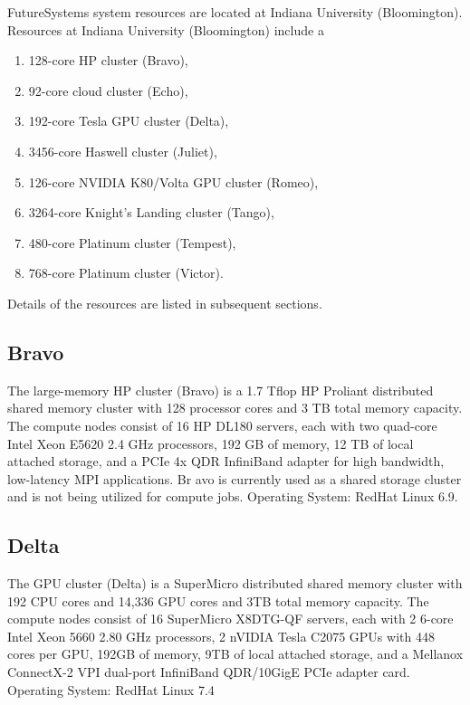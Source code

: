FutureSystems system resources are located at Indiana University
(Bloomington). Resources at Indiana University (Bloomington) include a 

\begin{enumerate}
\item 128-core HP cluster (Bravo), 
\item 92-core cloud cluster (Echo), 
\item 192-core Tesla GPU cluster (Delta),
\item 3456-core Haswell cluster (Juliet), 
\item 126-core NVIDIA K80/Volta GPU cluster (Romeo), 
\item 3264-core Knight’s Landing cluster (Tango), 
\item 480-core Platinum cluster (Tempest), 
\item 768-core Platinum cluster (Victor).
\end{enumerate}

Details of the resources are listed in subsequent sections. 

\subsection{Bravo}

The large-memory HP cluster (Bravo) is a 1.7 Tflop HP Proliant
distributed shared memory cluster with 128 processor cores and 3 TB
total memory capacity. The compute nodes consist of 16 HP DL180
servers, each with two quad-core Intel Xeon E5620 2.4 GHz processors,
192 GB of memory, 12 TB of local attached storage, and a PCIe 4x QDR
InfiniBand adapter for high bandwidth, low-latency MPI
applications. Br avo is currently used as a shared storage cluster and
is not being utilized for compute jobs. Operating System: RedHat Linux
6.9.

\subsection{Delta}

The GPU cluster (Delta) is a SuperMicro distributed shared memory
cluster with 192 CPU cores and 14,336 GPU cores and 3TB total memory
capacity. The compute nodes consist of 16 SuperMicro X8DTG-QF servers,
each with 2 6-core Intel Xeon 5660 2.80 GHz processors, 2 nVIDIA Tesla
C2075 GPUs with 448 cores per GPU, 192GB of memory, 9TB of local
attached storage, and a Mellanox ConnectX-2 VPI dual-port InfiniBand
QDR/10GigE PCIe adapter card. Operating System: RedHat Linux 7.4

